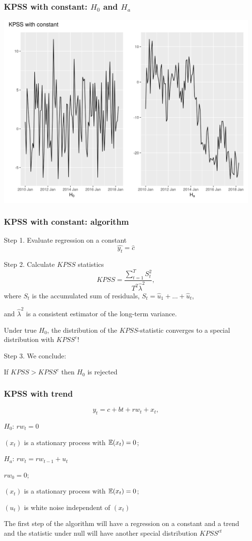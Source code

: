 \begin{frame}
	\frametitle{KPSS with constant: $H_0$ and $H_a$}
	\includegraphics[width=\textwidth]{pictures/om_ts_06-077.png}
	
\end{frame}

\begin{frame}
	\frametitle{KPSS with constant: algorithm}
	
	Step 1. Evaluate regression on a \alert{constant }
	\[
	\widehat{y_t} = \hat c
	\]
	
	\pause
	Step 2. Calculate $KPSS$ statistics
	\[
	KPSS = \frac{\sum_{t=1}^T S_t^2}{T^2 \hat \lambda^2},
	\]
	where $S_t$ is the accumulated sum of residuals, $S_t = \hat u_1 + \ldots + \hat u_t$,
	
	and $\hat\lambda^2$ is a consistent estimator of the long-term variance.
	
	\pause
	Under true $H_0$, the distribution of the $KPSS$-statistic converges to a  \alert{special distribution} with $KPSS^c$!
	
	\pause
	Step 3. We conclude:
	
	If $KPSS > KPSS^c$ then $H_0$ is rejected
	
\end{frame}


\begin{frame}
	\frametitle{KPSS with trend}
	\[
	y_t = c + bt + rw_t + x_t,
	\]
	
	\pause
	
	\alert{$H_0$: $rw_t = 0$}
	
	$(x_t)$ is a stationary process with $\mathbb{E}(x_t) = 0$;
	
	\pause
	
	\alert{$H_a$: $rw_t = rw_{t-1} + u_t$}
	
	$rw_0 = 0$;
	
	$(x_t)$ is a stationary process with $\mathbb{E}(x_t) = 0$;
	
	$(u_t)$ is white noise independent of $(x_t)$
	
	\pause
	
	The first step of the algorithm will have a regression \alert{on a constant and a trend} and the statistic under null will have   another special distribution $KPSS^{ct}$
	
\end{frame}


